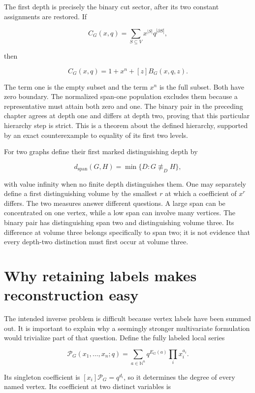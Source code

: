 \documentclass[
  11pt,
  a4paper,
]{report}
\begin{document}
The first depth is precisely the binary cut sector, after its two
constant assignments are restored. If

\[
C_G(x,q)=\sum_{S\subseteq V}x^{|S|}q^{|\partial S|},
\]

then

\[
C_G(x,q)=1+x^n+[z]B_G(x,q,z).
\tag{SNG-I002}
\]

The term one is the empty subset and the term \(x^n\) is the full
subset. Both have zero boundary. The normalized span-one population
excludes them because a representative must attain both zero and one.
The binary pair in the preceding chapter agrees at depth one and differs
at depth two, proving that this particular hierarchy step is strict.
This is a theorem about the defined hierarchy, supported by an exact
counterexample to equality of its first two levels.

For two graphs define their first marked distinguishing depth by

\[
d_{\mathrm{span}}(G,H)=\min\{D:G\not\equiv_DH\},
\]

with value infinity when no finite depth distinguishes them. One may
separately define a first distinguishing volume by the smallest \(r\) at
which a coefficient of \(x^r\) differs. The two measures answer
different questions. A large span can be concentrated on one vertex,
while a low span can involve many vertices. The binary pair has
distinguishing span two and distinguishing volume three. Its difference
at volume three belongs specifically to span two; it is not evidence
that every depth-two distinction must first occur at volume three.

\hypertarget{why-retaining-labels-makes-reconstruction-easy}{%
\section{Why retaining labels makes reconstruction
easy}\label{why-retaining-labels-makes-reconstruction-easy}}

The intended inverse problem is difficult because vertex labels have
been summed out. It is important to explain why a seemingly stronger
multivariate formulation would trivialize part of that question. Define
the fully labeled local series

\[
\mathscr P_G(x_1,\ldots,x_n;q)
=\sum_{a\in\mathbb N^n}q^{E_G(a)}\prod_i x_i^{a_i}.
\]

Its singleton coefficient is \([x_i]\mathscr P_G=q^{d_i}\), so it
determines the degree of every named vertex. Its coefficient at two
distinct variables is
\end{document}
